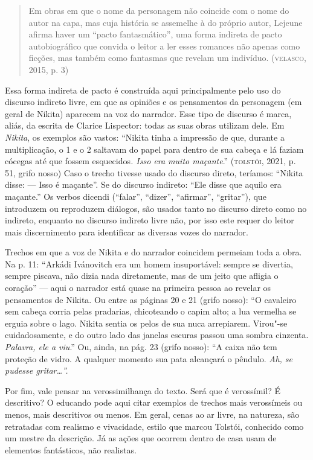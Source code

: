 \documentclass{article}
\begin{document}
\begin{enumerate}
\begin{quote}
Em obras em que o nome da personagem não coincide com o nome do autor na
capa, mas cuja história se assemelhe à do próprio autor, Lejeune afirma
haver um ``pacto fantasmático'', uma forma indireta de pacto
autobiográfico que convida o leitor a ler esses romances não apenas como
ficções, mas também como fantasmas que revelam um indivíduo.
(\textsc{velasco}, 2015, p. 3)
\end{quote}

Essa forma indireta de pacto é construída aqui principalmente pelo uso
do discurso indireto livre, em que as opiniões e os pensamentos da
personagem (em geral de Nikita) aparecem na voz do narrador. Esse tipo
de discurso é marca, aliás, da escrita de Clarice Lispector: todas as
suas obras utilizam dele. Em \emph{Nikita}, os exemplos são vastos:
``Nikita tinha a impressão de que, durante a multiplicação, o 1 e o 2
saltavam do papel para dentro de sua cabeça e lá faziam cócegas até que
fossem esquecidos\emph{. Isso era muito maçante}.'' (\textsc{tolstói}, 2021, p.
51, grifo nosso) Caso o trecho tivesse usado do discurso direto,
teríamos: ``Nikita disse: --- Isso é maçante''. Se do discurso indireto:
``Ele disse que aquilo era maçante.'' Os verbos dicendi (``falar'',
``dizer'', ``afirmar'', ``gritar''), que introduzem ou reproduzem
diálogos, são usados tanto no discurso direto como no indireto, enquanto
no discurso indireto livre não, por isso este requer do leitor mais
discernimento para identificar as diversas vozes do narrador.

Trechos em que a voz de Nikita e do narrador coincidem permeiam toda a
obra. Na p. 11: ``Arkádi Ivánovitch era um homem insuportável: sempre se
divertia, sempre piscava, não dizia nada diretamente, mas de um jeito
que afligia o coração'' --- aqui o narrador está quase na primeira
pessoa ao revelar os pensamentos de Nikita. Ou entre as páginas 20 e 21
(grifo nosso): ``O cavaleiro sem cabeça corria pelas pradarias,
chicoteando o capim alto; a lua vermelha se erguia sobre o lago. Nikita
sentia os pelos de sua nuca arrepiarem. Virou"-se cuidadosamente, e do
outro lado das janelas escuras passou uma sombra cinzenta.
\emph{Palavra, ele a viu}.'' Ou, ainda, na pág. 23 (grifo nosso): ``A
caixa não tem proteção de vidro. A qualquer momento sua pata alcançará o
pêndulo. \emph{Ah, se pudesse gritar\ldots{}''.}

Por fim, vale pensar na verossimilhança do texto. Será que é
verossímil? É descritivo? O educando pode aqui citar exemplos de trechos
mais verossímeis ou menos, mais descritivos ou menos. Em geral, cenas ao
ar livre, na natureza, são retratadas com realismo e vivacidade, estilo
que marcou Tolstói, conhecido como um mestre da descrição. Já as ações
que ocorrem dentro de casa usam de elementos fantásticos, não realistas.
\end{enumerate}
\end{document}

